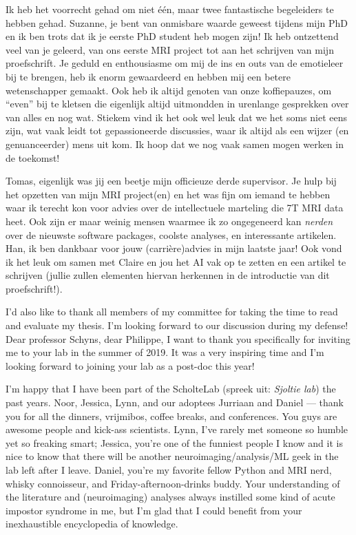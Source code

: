 \documentclass[12pt,american,a4paper,oneside,]{memoir} %
\begin{document}
Ik heb het voorrecht gehad om niet één, maar twee fantastische begeleiders te hebben gehad. Suzanne, je bent van onmisbare waarde geweest tijdens mijn PhD en ik ben trots dat ik je eerste PhD student heb mogen zijn! Ik heb ontzettend veel van je geleerd, van ons eerste MRI project tot aan het schrijven van mijn proefschrift. Je geduld en enthousiasme om mij de ins en outs van de emotieleer bij te brengen, heb ik enorm gewaardeerd en hebben mij een betere wetenschapper gemaakt. Ook heb ik altijd genoten van onze koffiepauzes, om ``even'' bij te kletsen die eigenlijk altijd uitmondden in urenlange gesprekken over van alles en nog wat. Stiekem vind ik het ook wel leuk dat we het soms niet eens zijn, wat vaak leidt tot gepassioneerde discussies, waar ik altijd als een wijzer (en genuanceerder) mens uit kom. Ik hoop dat we nog vaak samen mogen werken in de toekomst!

Tomas, eigenlijk was jij een beetje mijn officieuze derde supervisor. Je hulp bij het opzetten van mijn MRI project(en) en het was fijn om iemand te hebben waar ik terecht kon voor advies over de intellectuele marteling die 7T MRI data heet. Ook zijn er maar weinig mensen waarmee ik zo ongegeneerd kan \emph{nerden} over de nieuwste software packages, coolste analyses, en interessante artikelen. Han, ik ben dankbaar voor jouw (carrière)advies in mijn laatste jaar! Ook vond ik het leuk om samen met Claire en jou het AI vak op te zetten en een artikel te schrijven (jullie zullen elementen hiervan herkennen in de introductie van dit proefschrift!).

I'd also like to thank all members of my committee for taking the time to read and evaluate my thesis. I'm looking forward to our discussion during my defense! Dear professor Schyns, dear Philippe, I want to thank you specifically for inviting me to your lab in the summer of 2019. It was a very inspiring time and I'm looking forward to joining your lab as a post-doc this year!

I'm happy that I have been part of the ScholteLab (spreek uit: \emph{Sjoltie lab}) the past years. Noor, Jessica, Lynn, and our adoptees Jurriaan and Daniel --- thank you for all the dinners, vrijmibos, coffee breaks, and conferences. You guys are awesome people and kick-ass scientists. Lynn, I've rarely met someone so humble yet so freaking smart; Jessica, you're one of the funniest people I know and it is nice to know that there will be another neuroimaging/analysis/ML geek in the lab left after I leave. Daniel, you're my favorite fellow Python and MRI nerd, whisky connoisseur, and Friday-afternoon-drinks buddy. Your understanding of the literature and (neuroimaging) analyses always instilled some kind of acute impostor syndrome in me, but I'm glad that I could benefit from your inexhaustible encyclopedia of knowledge.
\end{document}
